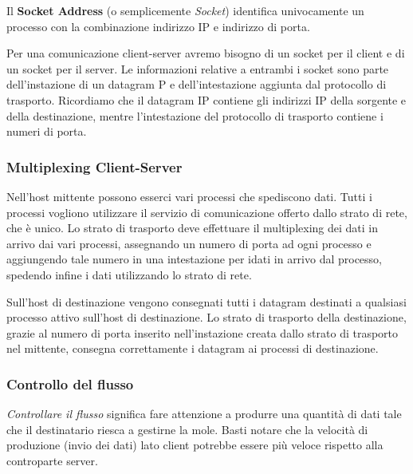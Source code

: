             Il \textbf{Socket Address} (o semplicemente \textit{Socket}) identifica univocamente un processo con la combinazione indirizzo IP e indirizzo di porta. 
                
            \vspace{3mm}    
            
            Per una comunicazione client-server avremo bisogno di un socket per il client e di un socket per il server. Le informazioni relative a entrambi i socket sono parte dell'instazione di un datagram P e dell'intestazione aggiunta dal protocollo di trasporto. Ricordiamo che il datagram IP contiene gli indirizzi IP della sorgente e della destinazione, mentre l'intestazione del protocollo di trasporto contiene i numeri di porta.
        
        \subsubsection{Multiplexing Client-Server}
        
            Nell'host mittente possono esserci vari processi che spediscono dati. Tutti i processi vogliono utilizzare il servizio di comunicazione offerto dallo strato di rete, che è unico. Lo strato di trasporto deve effettuare il multiplexing dei dati in arrivo dai vari processi, assegnando un numero di porta ad ogni processo e aggiungendo tale numero in una intestazione per idati in arrivo dal processo, spedendo infine i dati utilizzando lo strato di rete.
            
            \vspace{3mm}
            
            Sull'host di destinazione vengono consegnati tutti i datagram destinati a qualsiasi processo attivo sull'host di destinazione. Lo strato di trasporto della destinazione, grazie al numero di porta inserito nell'instazione creata dallo strato di trasporto nel mittente, consegna correttamente i datagram ai processi di destinazione.
    
        \subsubsection{Controllo del flusso}
        
            \textit{Controllare il flusso} significa fare attenzione a produrre una quantità di dati tale che il destinatario riesca a gestirne la mole. Basti notare che la velocità di produzione (invio dei dati) lato client potrebbe essere più veloce rispetto alla controparte server.
            
